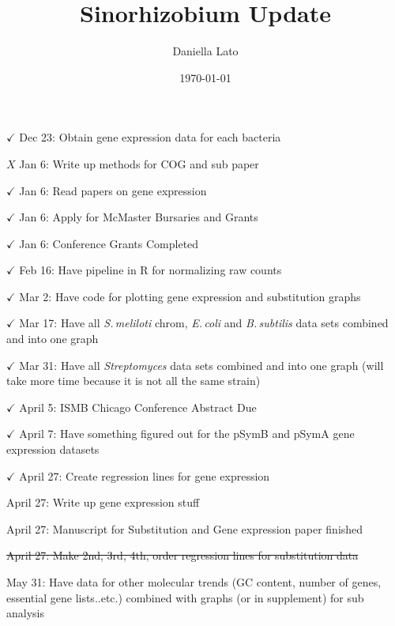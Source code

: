 \documentclass[12pt]{article}
\title{Sinorhizobium Update}
\author{Daniella Lato}
\date{\today}
\newcommand{\smel}{\textit{S.\,meliloti}\xspace}
\newcommand{\strep}{\textit{Streptomyces}\xspace}
\newcommand{\bass}{\textit{B.\,subtilis}\xspace}
\newcommand{\ecol}{\textit{E.\,coli}\xspace}
\newcommand{\pa}{pSymA\xspace}
\newcommand{\pb}{pSymB\xspace}
\begin{document}
$\checkmark$	Dec 23:	Obtain gene expression data for each bacteria
	

	
	
	
	
	
	
$X$	Jan 6: Write up methods for COG and sub paper

$\checkmark$	Jan 6: Read papers on gene expression
	
$\checkmark$	Jan 6: Apply for McMaster Bursaries and Grants
	
$\checkmark$	Jan 6:	Conference Grants Completed	

$\checkmark$	Feb 16: Have pipeline in R for normalizing raw counts
	
$\checkmark$	Mar 2: Have code for plotting gene expression and substitution graphs
	
$\checkmark$	Mar 17: Have all \smel chrom, \ecol and \bass data sets combined and into one graph
	
$\checkmark$	Mar 31: Have all \strep data sets combined and into one graph (will take more time because it is not all the same strain)
	
$\checkmark$	April 5: ISMB Chicago Conference Abstract Due
	
$\checkmark$	April 7: Have something figured out for the \pb and \pa gene expression datasets

$\checkmark$	April 27: Create regression lines for gene expression
	
	April 27: Write up gene expression stuff
	
	April 27: Manuscript for Substitution and Gene expression paper finished
	
	\sout{April 27: Make 2nd, 3rd, 4th, order regression lines for substitution data}
	
	May 31:	Have data for other molecular trends (GC content, number of genes, essential gene lists..etc.) combined with graphs (or in supplement) for sub analysis
	
\end{document}
